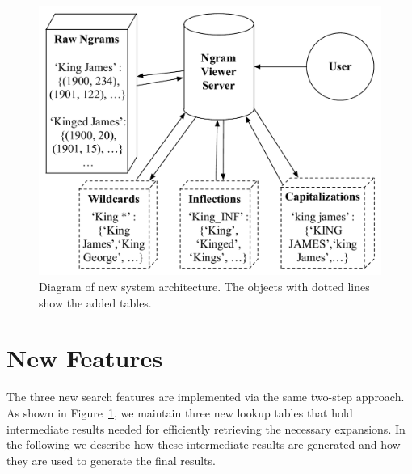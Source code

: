 \documentclass[11pt,a4paper]{article}
\begin{document}
\begin{figure}
\includegraphics[width=\columnwidth,keepaspectratio=true]{system_architecture}
\caption{\label{fig:architecture}Diagram of new system architecture. The objects with dotted lines show the added tables.}
\end{figure}


\section{New Features}
\label{sec:features}
The three new search features are implemented via the same two-step approach. As shown in Figure~\ref{fig:architecture}, we maintain three new lookup tables that hold intermediate results needed for efficiently retrieving the necessary expansions. In the following we describe how these intermediate results are generated and how they are used to generate the final results.
\end{document}
